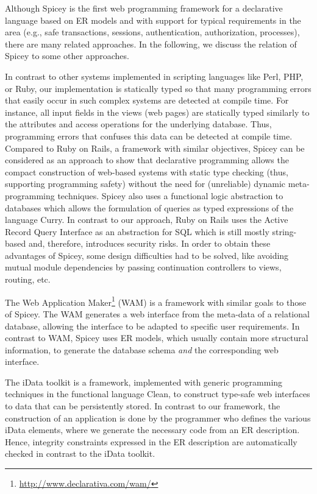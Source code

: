 \documentclass{tlp}
\renewcommand{\tt}{\usefont{OT1}{cmtt}{m}{n}\selectfont}
\begin{document}
Although Spicey is the first web programming framework
for a declarative language based on ER models and with support
for typical requirements in the area (e.g., safe transactions,
sessions, authentication, authorization, processes),
there are many related approaches.
In the following, we discuss the relation of Spicey
to some other approaches.

In contrast to other systems implemented in scripting
languages like Perl, PHP, or Ruby,
our implementation is statically typed so that many programming errors
that easily occur in such complex systems are detected at compile time.
For instance, all input fields in the views (web pages)
are statically typed similarly to the attributes and access
operations for the underlying database. Thus, programming errors
that confuses this data can be detected at compile time.
Compared to Ruby on Rails, a framework with similar objectives,
Spicey can be considered as an approach to show that
declarative programming allows the compact construction
of web-based systems with static type checking
(thus, supporting programming safety)
without the need for (unreliable) dynamic meta-programming techniques.
Spicey also uses a functional logic abstraction
to databases which allows the formulation of queries
as typed expressions of the language Curry.
In contrast to our  approach, Ruby on Rails uses the Active Record Query
Interface as an abstraction for SQL which is still mostly string-based and,
therefore, introduces security risks.
In order to obtain these advantages of Spicey, some design difficulties
had to be solved, like avoiding mutual module dependencies
by passing continuation controllers to views, routing, etc.

The Web Application Maker\footnote{\tt\url{http://www.declarativa.com/wam/}}
(WAM) is a framework with similar goals to those of Spicey.
The WAM generates a web interface from the meta-data of a relational
database, allowing the interface to be adapted to
specific user requirements. In contrast to WAM,
Spicey uses ER models, which usually contain more structural information,
to generate the database schema \emph{and} the corresponding web interface.

The iData toolkit \cite{PlasmeijerAchten06FLOPS}
is a framework, implemented with generic programming techniques
in the functional language Clean, to construct type-safe web interfaces
to data that can be persistently stored.
In contrast to our framework, the construction of an application
is done by the programmer who defines the various iData elements,
where we generate the necessary code from an ER description.
Hence, integrity constraints expressed in the ER description
are automatically checked in contrast to the iData toolkit.
\end{document}

